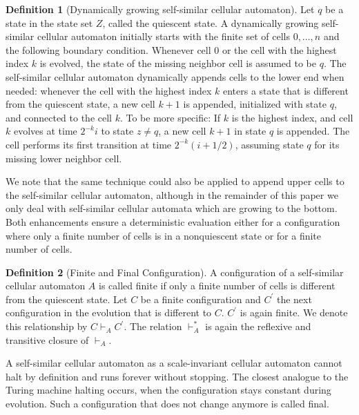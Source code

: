 \documentclass[pre,showpacs,showkeys,preprint]{revtex4}
\theoremstyle{definition}
\newtheorem{defn}{Definition}
\begin{document}
\begin{defn}[Dynamically growing self-similar cellular automaton]
Let $q$ be a state in the state set $Z$, called the quiescent state.
A dynamically growing self-similar cellular automaton initially starts with the finite set of cells $0, \ldots, n$ and the following
boundary condition.
Whenever cell $0$ or the cell with the highest index $k$ is evolved, the state of the missing neighbor cell is assumed to be $q$.
The self-similar cellular automaton dynamically appends cells to the lower end when needed:
whenever the cell with the highest index $k$ enters a state that is different from the quiescent state,
a new cell $k + 1$ is appended, initialized with state $q$, and connected to the cell $k$.
To be more specific: If $k$ is the highest index, and cell $k$ evolves at time $2^{-k} i$ to state $z \neq q$,
a new cell $k + 1$ in state $q$ is appended.
The cell performs its first transition at time $2^{-k}(i + 1/2)$, assuming state $q$ for its missing
lower neighbor cell.
\end{defn}

We note that the same technique could also be applied to append upper cells to the self-similar cellular automaton, although in the remainder of this paper we only deal
with self-similar cellular automata which are growing to the bottom.
Both enhancements ensure a deterministic evaluation either for a configuration where only a finite number of cells is in a nonquiescent state
or for a finite number of cells.

\begin{defn}[Finite and Final Configuration]
A configuration of a self-similar cellular automaton $A$ is called finite if only a finite number of cells is different from the quiescent state.
Let $C$ be a finite configuration and $C^\prime$ the next configuration in the evolution that is
different to $C$.
$C^\prime$ is again finite.
We denote this relationship by $C \vdash_{A} C^\prime$.
The relation $\vdash_{A}^*$ is again the reflexive and transitive closure of $\vdash_{A}$.

A self-similar cellular automaton as a scale-invariant cellular automaton cannot halt by definition  and runs forever without stopping.
The closest analogue to the Turing machine halting occurs, when the configuration stays constant during evolution.
Such a configuration that does not change anymore is called final.
\end{defn}
\end{document}
